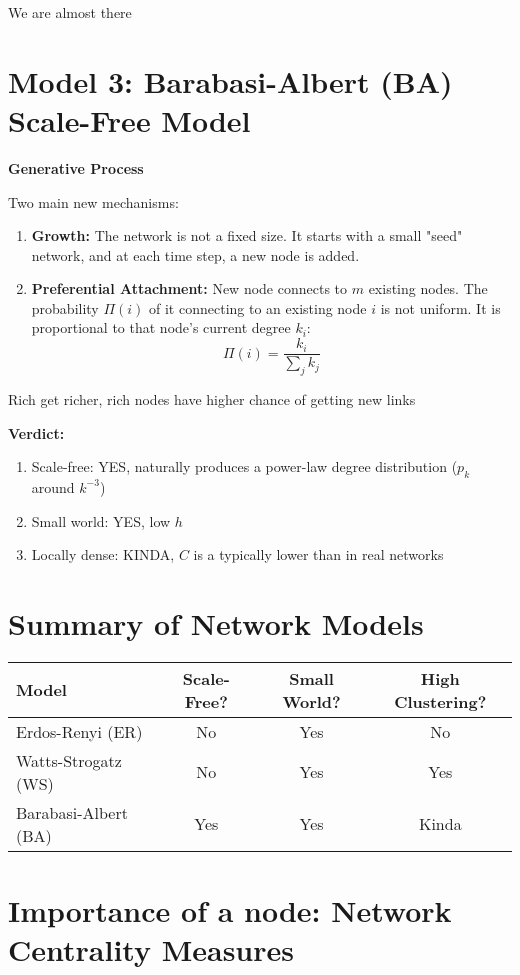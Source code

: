 We are almost there

\section*{Model 3: Barabasi-Albert (BA) Scale-Free Model}

\textbf{Generative Process}

Two main new mechanisms:

\begin{enumerate}
    \item \textbf{Growth:} The network is not a fixed size. It starts with a small "seed" 
    network, and at each time step, a new node is added.
    \item \textbf{Preferential Attachment:} New node connects to $m$ existing nodes. 
    The probability $\Pi(i)$ of it connecting to an existing node $i$ is not uniform. 
    It is proportional to that node's current degree $k_i$:
    \[
    \Pi(i) = \frac{k_i}{\sum_{j}k_j}
    \]
\end{enumerate}

Rich get richer, rich nodes have higher chance of getting new links

\textbf{Verdict:}
\begin{enumerate}
    \item Scale-free: YES, naturally produces a power-law degree distribution ($p_k$ around $k^{-3}$)
    \item Small world: YES, low $h$
    \item Locally dense: KINDA, $C$ is a typically lower than in real networks
\end{enumerate}

\section*{Summary of Network Models}

\renewcommand{\arraystretch}{1.2}
\setlength{\tabcolsep}{8pt}
\begin{tabular}{|l|c|c|c|}
\hline
\textbf{Model} & \textbf{Scale-Free?} & \textbf{Small World?} & \textbf{High Clustering?} \\
\hline
Erdos-Renyi (ER) & No & Yes & No \\
Watts-Strogatz (WS) & No & Yes & Yes \\
Barabasi-Albert (BA) & Yes & Yes & Kinda \\
\hline
\end{tabular}

\section*{Importance of a node: Network Centrality Measures}

